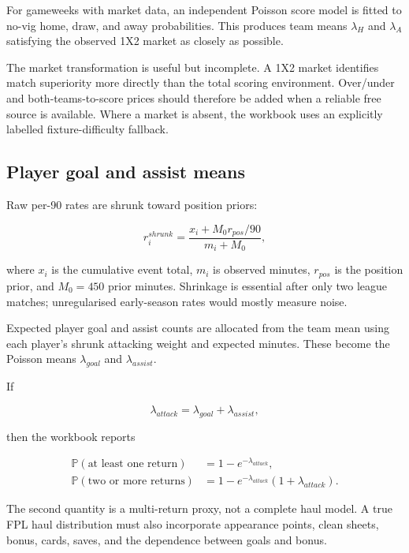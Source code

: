 \documentclass[11pt,a4paper]{article}
\newcommand{\Prob}{\mathbb{P}}
\begin{document}
For gameweeks with market data, an independent Poisson score model is fitted to no-vig home, draw, and away probabilities. This produces team means $\lambda_H$ and $\lambda_A$ satisfying the observed 1X2 market as closely as possible.

The market transformation is useful but incomplete. A 1X2 market identifies match superiority more directly than the total scoring environment. Over/under and both-teams-to-score prices should therefore be added when a reliable free source is available. Where a market is absent, the workbook uses an explicitly labelled fixture-difficulty fallback.

\subsection{Player goal and assist means}

Raw per-90 rates are shrunk toward position priors:

\begin{equation}
r^{shrunk}_{i}
= \frac{x_i+M_0r_{pos}/90}{m_i+M_0},
\end{equation}

where $x_i$ is the cumulative event total, $m_i$ is observed minutes, $r_{pos}$ is the position prior, and $M_0=450$ prior minutes. Shrinkage is essential after only two league matches; unregularised early-season rates would mostly measure noise.

Expected player goal and assist counts are allocated from the team mean using each player's shrunk attacking weight and expected minutes. These become the Poisson means $\lambda_{goal}$ and $\lambda_{assist}$.

If

\begin{equation}
\lambda_{attack}=\lambda_{goal}+\lambda_{assist},
\end{equation}

then the workbook reports

\begin{align}
\Prob(\text{at least one return})
  &=1-e^{-\lambda_{attack}},\\
\Prob(\text{two or more returns})
  &=1-e^{-\lambda_{attack}}(1+\lambda_{attack}).
\end{align}

The second quantity is a multi-return proxy, not a complete haul model. A true FPL haul distribution must also incorporate appearance points, clean sheets, bonus, cards, saves, and the dependence between goals and bonus.
\end{document}
